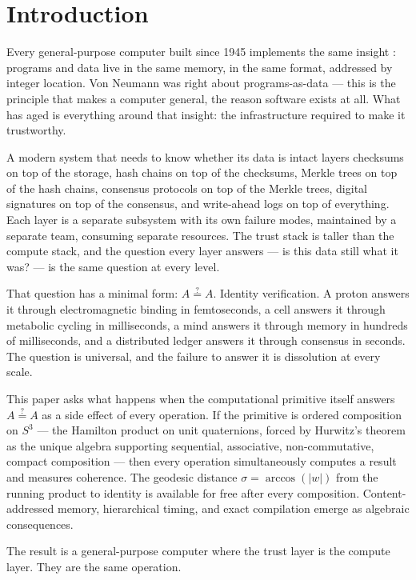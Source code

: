 \documentclass[12pt,a4paper]{article}
\begin{document}
\section{Introduction}

Every general-purpose computer built since 1945 implements the same insight \cite{vonneumann1945}: programs and data live in the same memory, in the same format, addressed by integer location. Von Neumann was right about programs-as-data --- this is the principle that makes a computer general, the reason software exists at all. What has aged is everything around that insight: the infrastructure required to make it trustworthy.

A modern system that needs to know whether its data is intact layers checksums on top of the storage, hash chains on top of the checksums, Merkle trees on top of the hash chains, consensus protocols on top of the Merkle trees, digital signatures on top of the consensus, and write-ahead logs on top of everything. Each layer is a separate subsystem with its own failure modes, maintained by a separate team, consuming separate resources. The trust stack is taller than the compute stack, and the question every layer answers --- is this data still what it was? --- is the same question at every level.

That question has a minimal form: $A \stackrel{?}{=} A$. Identity verification. A proton answers it through electromagnetic binding in femtoseconds, a cell answers it through metabolic cycling in milliseconds, a mind answers it through memory in hundreds of milliseconds, and a distributed ledger answers it through consensus in seconds. The question is universal, and the failure to answer it is dissolution at every scale.

This paper asks what happens when the computational primitive itself answers $A \stackrel{?}{=} A$ as a side effect of every operation. If the primitive is ordered composition on $S^3$ --- the Hamilton product on unit quaternions, forced by Hurwitz's theorem \cite{hurwitz1898} as the unique algebra supporting sequential, associative, non-commutative, compact composition --- then every operation simultaneously computes a result and measures coherence. The geodesic distance $\sigma = \arccos(|w|)$ from the running product to identity is available for free after every composition. Content-addressed memory, hierarchical timing, and exact compilation emerge as algebraic consequences.

The result is a general-purpose computer where the trust layer is the compute layer. They are the same operation.
\end{document}
